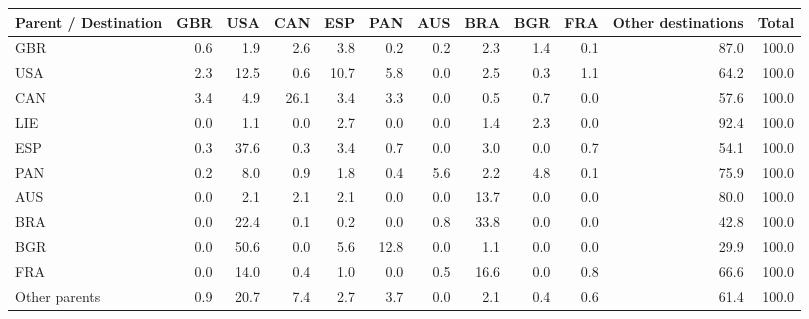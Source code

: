 \begin{tabular}{lrrrrrrrrrrr}
\toprule
Parent / Destination & GBR & USA & CAN & ESP & PAN & AUS & BRA & BGR & FRA & Other destinations & Total \\
\midrule
GBR & 0.6 & 1.9 & 2.6 & 3.8 & 0.2 & 0.2 & 2.3 & 1.4 & 0.1 & 87.0 & 100.0 \\
USA & 2.3 & 12.5 & 0.6 & 10.7 & 5.8 & 0.0 & 2.5 & 0.3 & 1.1 & 64.2 & 100.0 \\
CAN & 3.4 & 4.9 & 26.1 & 3.4 & 3.3 & 0.0 & 0.5 & 0.7 & 0.0 & 57.6 & 100.0 \\
LIE & 0.0 & 1.1 & 0.0 & 2.7 & 0.0 & 0.0 & 1.4 & 2.3 & 0.0 & 92.4 & 100.0 \\
ESP & 0.3 & 37.6 & 0.3 & 3.4 & 0.7 & 0.0 & 3.0 & 0.0 & 0.7 & 54.1 & 100.0 \\
PAN & 0.2 & 8.0 & 0.9 & 1.8 & 0.4 & 5.6 & 2.2 & 4.8 & 0.1 & 75.9 & 100.0 \\
AUS & 0.0 & 2.1 & 2.1 & 2.1 & 0.0 & 0.0 & 13.7 & 0.0 & 0.0 & 80.0 & 100.0 \\
BRA & 0.0 & 22.4 & 0.1 & 0.2 & 0.0 & 0.8 & 33.8 & 0.0 & 0.0 & 42.8 & 100.0 \\
BGR & 0.0 & 50.6 & 0.0 & 5.6 & 12.8 & 0.0 & 1.1 & 0.0 & 0.0 & 29.9 & 100.0 \\
FRA & 0.0 & 14.0 & 0.4 & 1.0 & 0.0 & 0.5 & 16.6 & 0.0 & 0.8 & 66.6 & 100.0 \\
Other parents & 0.9 & 20.7 & 7.4 & 2.7 & 3.7 & 0.0 & 2.1 & 0.4 & 0.6 & 61.4 & 100.0 \\
\bottomrule
\end{tabular}
